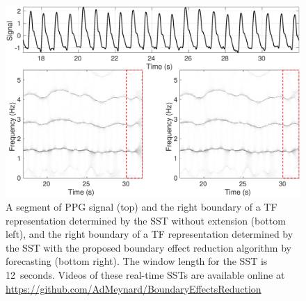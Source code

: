 \documentclass[journal]{IEEEtran}
\begin{document}
\begin{figure}
\centering
\includegraphics[width=.48\textwidth]{PPGsig.eps}
\caption{A segment of PPG signal (top) and the right boundary of a TF representation determined by the SST without extension (bottom left), and the right boundary of a TF representation determined by the SST with the proposed boundary effect reduction algorithm by forecasting (bottom right). The window length for the SST is 12~seconds. Videos of these real-time SSTs are available online at \url{https://github.com/AdMeynard/BoundaryEffectsReduction}}
\label{fig:ex.intro}
\end{figure}
\end{document}
